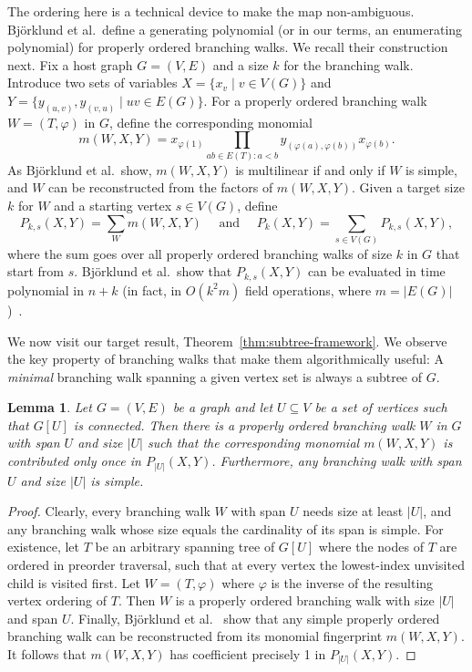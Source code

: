 \documentclass[10pt,a4paper]{article}
\newtheorem{lemma}{Lemma}[section]
\begin{document}
The ordering here is a technical device to make the map non-ambiguous.
Björklund et al.\ define a generating polynomial (or in our terms,
an enumerating polynomial) for properly ordered branching walks.
We recall their construction next.
Fix a host graph $G=(V,E)$ and a size $k$ for the branching walk.
Introduce two sets of variables $X=\{x_v \mid v \in V(G)\}$
and $Y=\{y_{(u,v)}, y_{(v,u)} \mid uv \in E(G)\}$.
For a properly ordered branching walk $W = (T, \varphi)$ in $G$, define the
corresponding monomial
\[
  m(W,X,Y) = x_{\varphi(1)} \prod_{ab \in E(T): a<b} y_{(\varphi(a),\varphi(b))} x_{\varphi(b)}.
\]
As Björklund et al.\ show, $m(W,X,Y)$ is multilinear if and only if
$W$ is simple, and $W$ can be reconstructed from the factors of $m(W,X,Y)$. 
Given a target size $k$ for $W$ and a starting vertex $s \in V(G)$, define
\[
  P_{k,s}(X,Y) = \sum_W m(W,X,Y) \quad \text{ and } \quad P_k(X,Y) = \sum_{s \in V(G)} P_{k,s}(X,Y),
\]
where the sum goes over all properly ordered branching walks of size
$k$ in $G$ that start from $s$. Björklund et al.\ show that $P_{k,s}(X,Y)$
can be evaluated in time polynomial in $n+k$ (in fact, in $O(k^2 m)$ field operations,
where $m=|E(G)|$)~\cite{BjorklundKK16}. 

We now visit our target result, Theorem~\ref{thm:subtree-framework}.
We observe the key property of branching walks that make them
algorithmically useful: A \emph{minimal}
branching walk spanning a given vertex set is always a subtree of $G$.

\begin{lemma} \label{lemma:branching-walks-simple}
  Let $G=(V,E)$ be a graph and let $U \subseteq V$ be a set of vertices such that $G[U]$ is connected.
  Then there is a properly ordered branching walk $W$ in $G$ with span $U$
  and size $|U|$ such that the corresponding monomial $m(W,X,Y)$ is contributed only once in $P_{|U|}(X,Y)$.
  Furthermore, any branching walk with span $U$ and size $|U|$ is simple.
\end{lemma}
\begin{proof}
  Clearly, every branching walk $W$ with span $U$ needs size at least $|U|$,
  and any branching walk whose size equals the cardinality of its span is simple.
  For existence, let $T$ be an arbitrary spanning tree of $G[U]$
  where the nodes of $T$ are ordered in preorder traversal, such
  that at every vertex the lowest-index unvisited child is visited
  first. Let $W=(T,\varphi)$ where $\varphi$ is the inverse of the
  resulting vertex ordering of $T$. Then $W$ is a properly ordered
  branching walk with size $|U|$ and span $U$. Finally,
  Björklund et al.~\cite{BjorklundKK16} show that any simple properly
  ordered branching walk can be reconstructed from its monomial
  fingerprint $m(W,X,Y)$. It follows that $m(W,X,Y)$ has coefficient
  precisely 1 in $P_{|U|}(X,Y)$. 
\end{proof}
\end{document}
